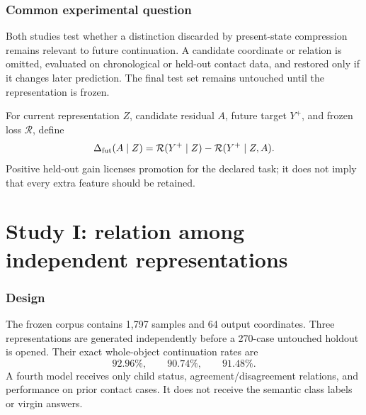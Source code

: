\documentclass[11pt,a4paper]{article}
\begin{document}
\MakeResearchTitle
\MakeResearchContents
{}
\section{Common experimental question}
Both studies test whether a distinction discarded by present-state compression remains relevant to future continuation. A candidate coordinate or relation is omitted, evaluated on chronological or held-out contact data, and restored only if it changes later prediction. The final test set remains untouched until the representation is frozen.

For current representation $Z$, candidate residual $A$, future target $Y^+$, and frozen loss $\mathcal R$, define
\begin{equation}
\Delta_{\rm fut}(A\mid Z)=\mathcal R(Y^+\mid Z)-\mathcal R(Y^+\mid Z,A).
\end{equation}
Positive held-out gain licenses promotion for the declared task; it does not imply that every extra feature should be retained.

\part{Study I: relation among independent representations}
\section{Design}
The frozen corpus contains 1,797 samples and 64 output coordinates. Three representations are generated independently before a 270-case untouched holdout is opened. Their exact whole-object continuation rates are
\begin{equation}
92.96\%,\qquad90.74\%,\qquad91.48\%.
\end{equation}
A fourth model receives only child status, agreement/disagreement relations, and performance on prior contact cases. It does not receive the semantic class labels or virgin answers.
\end{document}
